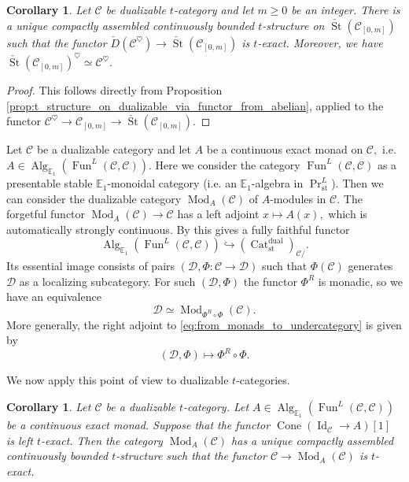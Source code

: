 \documentclass[11pt,leqno]{amsart}
\newtheorem{cor}[theo]{Corollary}
\numberwithin{equation}{section}
\newcommand{\hto}{\hookrightarrow}
\newcommand{\Cat}{\operatorname{Cat}}
\newcommand{\Cone}{\operatorname{Cone}}
\newcommand{\St}{\operatorname{St}}
\newcommand{\st}{\operatorname{st}}
\newcommand{\dual}{\operatorname{dual}}
\newcommand{\bE}{{\mathbb E}}
\newcommand{\cD}{{\mathcal D}}
\newcommand{\cC}{{\mathcal C}}
\newcommand{\Fun}{\operatorname{Fun}}
\newcommand{\Id}{\operatorname{Id}}
\newcommand{\Alg}{\operatorname{Alg}}
\newcommand{\Mod}{\operatorname{Mod}}
\begin{document}
\begin{cor}\label{cor:t_structure_on_check_St_of_C_0_m}
Let $\cC$ be dualizable $t$-category and let $m\geq 0$ be an integer. There is a unique compactly assembled continuously bounded $t$-structure on $\check{\St}(\cC_{[0,m]})$ such that the functor $\check{D}(\cC^{\heartsuit})\to \check{\St}(\cC_{[0,m]})$ is $t$-exact. Moreover, we have $\check{\St}(\cC_{[0,m]})^{\heartsuit}\simeq \cC^{\heartsuit}.$
\end{cor}

\begin{proof}
This follows directly from Proposition \ref{prop:t_structure_on_dualizable_via_functor_from_abelian}, applied to the functor $\cC^{\heartsuit}\to\cC_{[0,m]}\to\check{\St}(\cC_{[0,m]}).$
\end{proof}

Let $\cC$ be a dualizable category and let $A$ be a continuous exact monad on $\cC,$ i.e. $A\in\Alg_{\bE_1}(\Fun^L(\cC,\cC)).$ Here we consider the category $\Fun^L(\cC,\cC)$ as a presentable stable $\bE_1$-monoidal category (i.e. an $\bE_1$-algebra in $\Pr^L_{\st}$). Then we can consider the dualizable category $\Mod_A(\cC)$ of $A$-modules in $\cC.$ The forgetful functor $\Mod_A(\cC)\to\cC$ has a left adjoint $x\mapsto A(x),$ which is automatically strongly continuous. By \cite[Proposition C.1]{E24} this gives a fully faithful functor
\begin{equation}\label{eq:from_monads_to_undercategory}
	\Alg_{\bE_1}(\Fun^L(\cC,\cC))\hto (\Cat_{\st}^{\dual})_{\cC/}.
\end{equation} 
Its essential image consists of pairs $(\cD,\Phi:\cC\to\cD)$ such that $\Phi(\cC)$ generates $\cD$ as a localizing subcategory. For such $(\cD,\Phi)$ the functor $\Phi^R$ is monadic, so we have an equivalence
\begin{equation*}
	\cD\simeq \Mod_{\Phi^R\circ\Phi}(\cC).\end{equation*} More generally, the right adjoint to \eqref{eq:from_monads_to_undercategory} is given by
\begin{equation*}
	(\cD,\Phi)\mapsto \Phi^R\circ \Phi.
\end{equation*}

We now apply this point of view to dualizable $t$-categories.

\begin{cor}\label{cor:t_structures_on_modules}
	Let $\cC$ be a dualizable $t$-category. Let $A\in\Alg_{\bE_1}(\Fun^L(\cC,\cC))$ be a continuous exact monad. Suppose that the functor $\Cone(\Id_{\cC}\to A)[1]$ is left $t$-exact. Then the category $\Mod_A(\cC)$ has a unique compactly assembled continuously bounded $t$-structure such that the functor $\cC\to \Mod_A(\cC)$ is $t$-exact. 
\end{cor}
\end{document}
